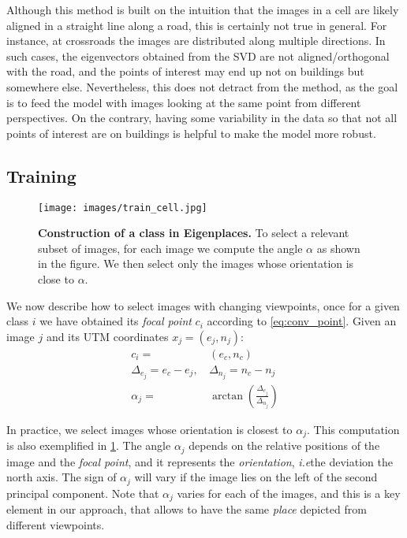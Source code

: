 \documentclass[10pt,twocolumn,letterpaper]{article}
\def\ie{\emph{i.e}\onedot}
\begin{document}
Although this method is built on the intuition that the images in a cell are likely aligned in a straight line along a road, this is certainly not true in general. For instance, at crossroads the images are distributed along multiple directions. In such cases, the eigenvectors obtained from the SVD are not aligned/orthogonal with the road, and the points of interest may end up not on buildings but somewhere else. Nevertheless, this does not detract from the method, as the goal is to feed the model with images looking at the same point from different perspectives. On the contrary, having some variability in the  data so that not all points of interest are on buildings is helpful to make the model more robust.



\subsection{Training}
\label{sec:training}

\begin{figure}
    \begin{center}
    \texttt{[image: images/train\_cell.jpg]}
    \end{center}
    \caption{\textbf{Construction of a class in Eigenplaces.}
    To select a relevant subset of images, for each image we compute the angle $\alpha$ as shown in the figure. We then select only the images whose orientation is close to $\alpha$.
    }
    \label{fig:train_cell}
\end{figure}

We now describe how to select images with changing viewpoints, once for a given class $i$ we have obtained its \textit{focal point} $c_i$ according to \cref{eq:conv_point}. Given an image $j$ and its UTM coordinates $x_j = (e_j, n_j)$:
\begin{equation}
\begin{aligned}
    c_i =& (e_c, n_c) \\
    \Delta_{e_j} = e_c - e_j, \, &
    \Delta_{n_j} = n_c - n_j \\
    \alpha_j =& \arctan(\frac{\Delta_{e_j}}{\Delta_{n_j}}) 
\end{aligned}
\label{eq:train_cell}
\end{equation}

In practice, we select images whose orientation is closest to $\alpha_j $. This computation is also exemplified in \cref{fig:train_cell}. The angle $\alpha_j$ depends on the relative positions of the image and the \textit{focal point}, and it represents the \textit{orientation}, \ie the deviation \wrt the north axis. The sign of $\alpha_j$ will vary if the image lies on the left of the second principal component.
Note that $\alpha_j$ varies for each of the images, and this is a key element in our approach, that allows to have the same \textit{place} depicted from different viewpoints.
\end{document}

